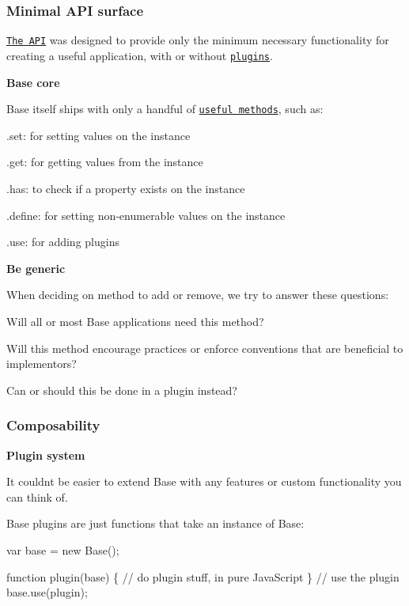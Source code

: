 \subsubsection*{Minimal A\+PI surface}

\href{#api}{\tt The A\+PI} was designed to provide only the minimum necessary functionality for creating a useful application, with or without \href{#plugins}{\tt plugins}.

{\bfseries Base core}

Base itself ships with only a handful of \href{#api}{\tt useful methods}, such as\+:


\begin{DoxyItemize}
\item {\ttfamily .set}\+: for setting values on the instance
\item {\ttfamily .get}\+: for getting values from the instance
\item {\ttfamily .has}\+: to check if a property exists on the instance
\item {\ttfamily .define}\+: for setting non-\/enumerable values on the instance
\item {\ttfamily .use}\+: for adding plugins
\end{DoxyItemize}

{\bfseries Be generic}

When deciding on method to add or remove, we try to answer these questions\+:


\begin{DoxyEnumerate}
\item Will all or most Base applications need this method?
\item Will this method encourage practices or enforce conventions that are beneficial to implementors?
\item Can or should this be done in a plugin instead?
\end{DoxyEnumerate}

\subsubsection*{Composability}

{\bfseries Plugin system}

It couldn\textquotesingle{}t be easier to extend Base with any features or custom functionality you can think of.

Base plugins are just functions that take an instance of {\ttfamily Base}\+:


\begin{DoxyCode}
var base = new Base();

function plugin(base) \{
  // do plugin stuff, in pure JavaScript
\}
// use the plugin
base.use(plugin);
\end{DoxyCode}



